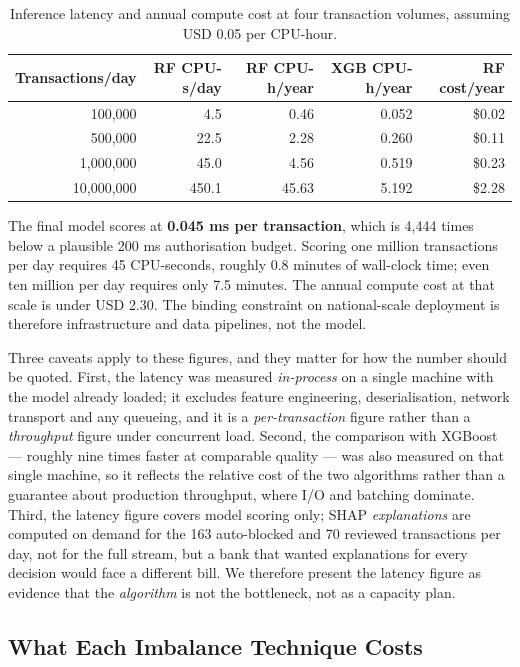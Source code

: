 \begin{table}[h!]
\centering
\caption{Inference latency and annual compute cost at four transaction
volumes, assuming USD 0.05 per CPU-hour.}
\label{tab:scale}
\begin{tabular}{rrrrr}
\toprule
\textbf{Transactions/day} & \textbf{RF CPU-s/day} & \textbf{RF CPU-h/year} & \textbf{XGB CPU-h/year} & \textbf{RF cost/year} \\
\midrule
100{,}000 & 4.5 & 0.46 & 0.052 & \$0.02 \\
500{,}000 & 22.5 & 2.28 & 0.260 & \$0.11 \\
1{,}000{,}000 & 45.0 & 4.56 & 0.519 & \$0.23 \\
10{,}000{,}000 & 450.1 & 45.63 & 5.192 & \$2.28 \\
\bottomrule
\end{tabular}
\end{table}

The final model scores at \textbf{0.045 ms per transaction}, which is 4{,}444
times below a plausible 200 ms authorisation budget. Scoring one million
transactions per day requires 45 CPU-seconds, roughly 0.8 minutes of
wall-clock time; even ten million per day requires only 7.5 minutes. The
annual compute cost at that scale is under USD 2.30. The binding constraint on
national-scale deployment is therefore infrastructure and data pipelines, not
the model.

Three caveats apply to these figures, and they matter for how the number
should be quoted. First, the latency was measured \emph{in-process} on a single
machine with the model already loaded; it excludes feature engineering,
deserialisation, network transport and any queueing, and it is a
\emph{per-transaction} figure rather than a \emph{throughput} figure under
concurrent load. Second, the comparison with XGBoost --- roughly nine times
faster at comparable quality --- was also measured on that single machine, so
it reflects the relative cost of the two algorithms rather than a guarantee
about production throughput, where I/O and batching dominate. Third, the
latency figure covers model scoring only; SHAP \emph{explanations} are
computed on demand for the 163 auto-blocked and 70 reviewed transactions per
day, not for the full stream, but a bank that wanted explanations for every
decision would face a different bill. We therefore present the latency figure
as evidence that the \emph{algorithm} is not the bottleneck, not as a
capacity plan.

\subsection{What Each Imbalance Technique Costs}

